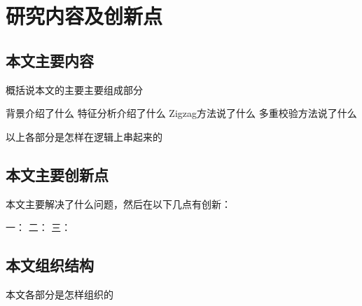 \section{研究内容及创新点}
\label{sec:intro:work}

\subsection{本文主要内容}
\label{sec:intro:work:mainwork}

概括说本文的主要主要组成部分

背景介绍了什么
特征分析介绍了什么
Zigzag方法说了什么
多重校验方法说了什么

以上各部分是怎样在逻辑上串起来的

\subsection{本文主要创新点}
\label{sec:intro:work:inno}

本文主要解决了什么问题，然后在以下几点有创新：

一：
二：
三：

\subsection{本文组织结构}
\label{sec:intro:work:struct}

本文各部分是怎样组织的